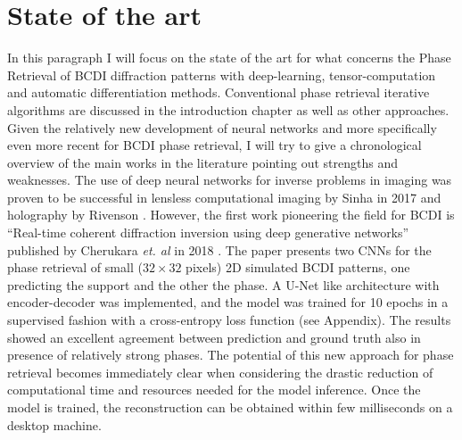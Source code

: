 \newpage

\section{State of the art}\label{chp:phasing_stateart}
In this paragraph I will focus on the state of the art for what concerns the Phase Retrieval of BCDI diffraction patterns with
deep-learning, tensor-computation and automatic differentiation methods. Conventional phase retrieval iterative algorithms 
are discussed in the introduction chapter as well as other approaches. \\
Given the relatively new development of neural networks and more specifically even more recent for BCDI phase retrieval, I will try
to give a chronological overview of the main works in the literature pointing out strengths and weaknesses.
The use of deep neural networks for inverse problems in imaging was proven to be successful in lensless computational 
imaging by Sinha in 2017 \cite{Sinha:17} and holography by Rivenson \cite{Rivenson2018}.
However, the first work pioneering the field for BCDI is ``Real-time coherent diffraction inversion using deep generative networks'' published
by Cherukara \textit{et. al} in 2018 \cite{cherukara_real-time_2018}. The paper presents two CNNs for the phase retrieval of small ($32\times32$ pixels) 2D 
simulated BCDI patterns, one predicting the support and the other the phase. A U-Net like architecture with 
encoder-decoder was implemented, and the model was trained for 10 epochs in a supervised fashion with a cross-entropy loss function (see Appendix).
The results showed an excellent agreement between prediction and ground truth also in presence of relatively strong phases. 
The potential of this new approach for phase retrieval becomes immediately clear when considering the drastic reduction of
computational time and resources needed for the model inference. Once the model is trained, the reconstruction can be obtained
within few milliseconds on a desktop machine. 

